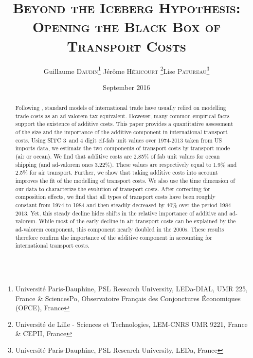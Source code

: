\documentclass[a4paper,11pt]{article}
\begin{document}
\title{\textsc{Beyond the Iceberg Hypothesis: \\Opening the Black Box of Transport Costs}} %
\author{Guillaume \textsc{Daudin}\thanks{%
Universit\'{e} Paris-Dauphine, PSL Research University, LEDa-DIAL, UMR 225, France \&
SciencesPo, Observatoire Français des Conjonctures \'{E}conomiques (OFCE), France}  \qquad J\'{e}r\^{o}me \textsc{H\'{e}ricourt} \thanks{Universit\'{e} de Lille - Sciences et Technologies, LEM-CNRS UMR 9221, France \& CEPII, France}\qquad Lise \textsc{Patureau}\thanks{Universit\'{e} Paris-Dauphine, PSL Research University, LEDa, France } }


\date{September 2016}
 \maketitle
\bigskip

\begin{abstract}
Following \cite{samuelson1954}, standard models of international trade have usually relied on modelling trade costs as an ad-valorem tax equivalent. However, many common empirical facts support the existence of additive costs. This paper provides a quantitative assessment of the size and the importance of the additive component in international transport costs.
Using SITC 3 and 4 digit cif-fab unit values over 1974-2013 taken from US imports data, we estimate the two components of transport costs by transport mode (air or ocean).
We find that additive costs are 2.85\% of fab unit values for ocean shipping (and ad-valorem ones 3.22\%). These values are respectively equal to 1.9\% and 2.5\% for air transport. Further, we show that taking additive costs into account improves the fit of the modelling of transport costs.
We also use the time dimension of our data to characterize the evolution of transport costs. After correcting for composition effects, we find that all types of transport costs have been roughly constant from 1974 to 1984 and then steadily decreased by 40\% over the period 1984-2013. Yet, this steady decline hides shifts in the relative importance of additive and ad-valorem. While most of the early decline in air transport costs can be explained by the ad-valorem component, this component nearly doubled in the 2000s. These results therefore confirm the importance of the additive component in accounting for international transport costs.
\end{abstract}
\end{document}
